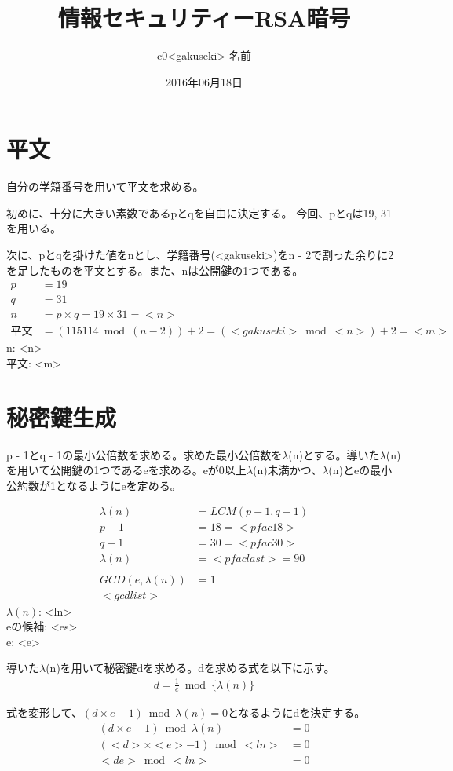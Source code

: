 \documentclass[uplatex]{jsarticle}
\title{情報セキュリティーRSA暗号}
\author{c0<gakuseki> 名前}
\date{2016年06月18日}
\begin{document}
\maketitle

\section{平文}
自分の学籍番号を用いて平文を求める。

初めに、十分に大きい素数であるpとqを自由に決定する。
今回、pとqは19, 31を用いる。

次に、pとqを掛けた値をnとし、学籍番号(<gakuseki>)をn - 2で割った余りに2を足したものを平文とする。また、nは公開鍵の1つである。
\begin{align*}
  p&=19\\
  q&=31\\
  n&=p \times q = 19 \times 31 = <n>\\
  平文&=(115114 \bmod (n - 2)) + 2 = (<gakuseki> \bmod <n>) + 2 = <m>
\end{align*}
n: <n>\\
平文: <m>


\section{秘密鍵生成}
p - 1とq - 1の最小公倍数を求める。求めた最小公倍数を$\lambda$(n)とする。導いた$\lambda$(n)を用いて公開鍵の1つであるeを求める。eが0以上$\lambda$(n)未満かつ、$\lambda$(n)とeの最小公約数が1となるようにeを定める。

\begin{align*}
  \lambda(n)&= LCM(p - 1, q- 1)\\
  p - 1&= 18 = <pfac18>\\
  q - 1&= 30 = <pfac30>\\
  \lambda(n)&= <pfaclast> = 90\\\\
  GCD(e, \lambda(n))&= 1\\
  <gcdlist>
\end{align*}
$\lambda(n)$: <ln>\\
eの候補: <es>\\
e: <e>

導いた$\lambda$(n)を用いて秘密鍵dを求める。dを求める式を以下に示す。
\begin{align*}
  d = \frac{1}{e} \bmod \{\lambda(n)\}
\end{align*}

式を変形して、$(d \times e - 1) \bmod \lambda(n) = 0$となるようにdを決定する。
\begin{align*}
  (d \times e - 1) \bmod \lambda(n)&= 0\\
  (<d> \times <e> - 1) \bmod <ln>&= 0\\
  <de> \bmod <ln> &=0
\end{align*}
\end{document}
